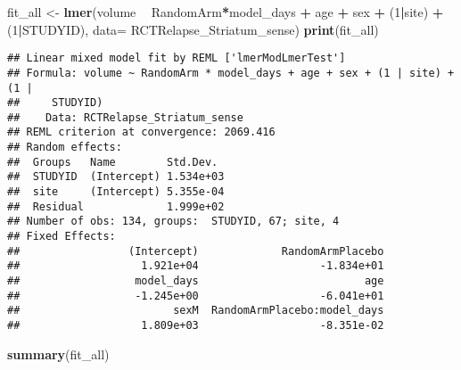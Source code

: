 \documentclass[]{article}
\newenvironment{Shaded}{\begin{snugshade}}{\end{snugshade}}
\newcommand{\KeywordTok}[1]{\textcolor[rgb]{0.13,0.29,0.53}{\textbf{#1}}}
\newcommand{\DataTypeTok}[1]{\textcolor[rgb]{0.13,0.29,0.53}{#1}}
\newcommand{\DecValTok}[1]{\textcolor[rgb]{0.00,0.00,0.81}{#1}}
\newcommand{\StringTok}[1]{\textcolor[rgb]{0.31,0.60,0.02}{#1}}
\newcommand{\OperatorTok}[1]{\textcolor[rgb]{0.81,0.36,0.00}{\textbf{#1}}}
\newcommand{\NormalTok}[1]{#1}
\theoremstyle{definition}
\theoremstyle{definition}
\theoremstyle{definition}
\theoremstyle{remark}
\begin{document}
\begin{Shaded}
\begin{Highlighting}[]
\NormalTok{    fit_all <-}\StringTok{ }\KeywordTok{lmer}\NormalTok{(volume }\OperatorTok{~}\StringTok{ }\NormalTok{RandomArm}\OperatorTok{*}\NormalTok{model_days }\OperatorTok{+}\StringTok{ }\NormalTok{age }\OperatorTok{+}\StringTok{ }\NormalTok{sex }\OperatorTok{+}\StringTok{ }\NormalTok{(}\DecValTok{1}\OperatorTok{|}\NormalTok{site) }\OperatorTok{+}\StringTok{ }\NormalTok{(}\DecValTok{1}\OperatorTok{|}\NormalTok{STUDYID), }\DataTypeTok{data=}\NormalTok{ RCTRelapse_Striatum_sense)}
  \KeywordTok{print}\NormalTok{(fit_all)}
\end{Highlighting}
\end{Shaded}

\begin{verbatim}
## Linear mixed model fit by REML ['lmerModLmerTest']
## Formula: volume ~ RandomArm * model_days + age + sex + (1 | site) + (1 |  
##     STUDYID)
##    Data: RCTRelapse_Striatum_sense
## REML criterion at convergence: 2069.416
## Random effects:
##  Groups   Name        Std.Dev. 
##  STUDYID  (Intercept) 1.534e+03
##  site     (Intercept) 5.355e-04
##  Residual             1.999e+02
## Number of obs: 134, groups:  STUDYID, 67; site, 4
## Fixed Effects:
##                 (Intercept)             RandomArmPlacebo  
##                   1.921e+04                   -1.834e+01  
##                  model_days                          age  
##                  -1.245e+00                   -6.041e+01  
##                        sexM  RandomArmPlacebo:model_days  
##                   1.809e+03                   -8.351e-02
\end{verbatim}

\begin{Shaded}
\begin{Highlighting}[]
  \KeywordTok{summary}\NormalTok{(fit_all)}
\end{Highlighting}
\end{Shaded}
\end{document}
